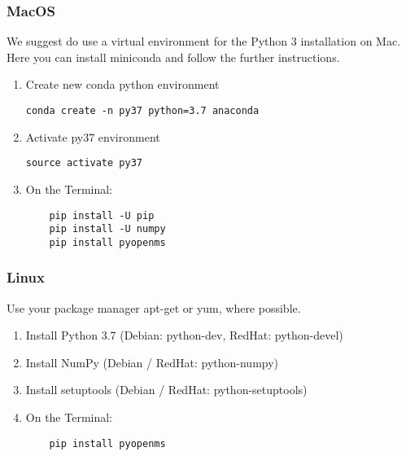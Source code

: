 {\subsubsection{MacOS}
We suggest do use a virtual environment for the Python 3 installation on Mac. 
Here you can install miniconda and follow the further instructions. \\

\begin{enumerate}
  \item Create new conda python environment
    \begin{code}
	\begin{verbatim}
conda create -n py37 python=3.7 anaconda
    \end{verbatim}
	\end{code} 
    \item Activate py37 environment
    \begin{code}
	\begin{verbatim}
source activate py37
    \end{verbatim}
	\end{code} 
  \item On the Terminal:
    \begin{code}
	\begin{verbatim}
    pip install -U pip
    pip install -U numpy
    pip install pyopenms
    \end{verbatim}
	\end{code}
\end{enumerate}

\subsubsection{Linux}
Use your package manager apt-get or yum, where possible.
\begin{enumerate}
  \item Install Python 3.7 (Debian: python-dev, RedHat: python-devel)
  \item Install NumPy (Debian / RedHat: python-numpy)
  \item Install setuptools (Debian / RedHat: python-setuptools)
  \item On the Terminal:
    \begin{code}
	\begin{verbatim}
    pip install pyopenms
    \end{verbatim}
	\end{code}
\end{enumerate}

}
